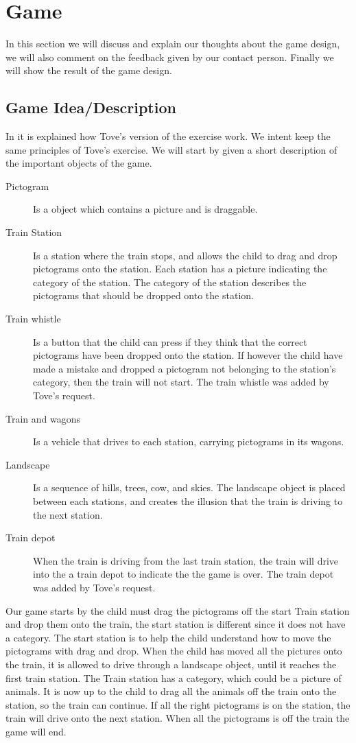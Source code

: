 \section{Game}
In this section we will discuss and explain our thoughts about the game design, we will also comment on the feedback given by our contact person. Finally we will show the result of the game design.
\subsection{Game Idea/Description}\label{sec:gameidea}
In  it is explained how Tove's version of the exercise work. We intent keep the same principles of Tove's exercise. We will start by given a short description of the important objects of the game.
\begin{description}
\item[Pictogram] Is a object which contains a picture and is draggable.
\item[Train Station] Is a station where the train stops, and allows the child to drag and drop pictograms onto the station. Each station has a picture indicating the category of the station. The category of the station describes the pictograms that should be dropped onto the station.  

\item[Train whistle] Is a button that the child can press if they think that the correct pictograms have been dropped onto the station. If however the child have made a mistake and dropped a pictogram not belonging to the station's category, then the train will not start. The train whistle was added by Tove's request.

\item[Train and wagons] Is a vehicle that drives to each station, carrying pictograms in its wagons.

\item[Landscape] Is a sequence of hills, trees, cow, and skies. The landscape object is placed between each stations, and creates the illusion that the train is driving to the next station.

\item[Train depot] When the train is driving from the last train station, the train will drive into the a train depot to indicate the the game is over. The train depot was added by Tove's request.
\end{description}
Our game starts by the child must drag the pictograms off the start Train station and drop them onto the train, the start station is different since it does not have a category. The start station is to help the child understand how to move the pictograms with drag and drop. When the child has moved all the pictures onto the train, it is allowed to drive through a landscape object, until it reaches the first train station.
The Train station has a category, which could be a picture of animals. It is now up to the child to drag all the animals off the train onto the station, so the train can continue. If all the right pictograms is on the station, the train will drive onto the next station. When all the pictograms is off the train the game will end.

